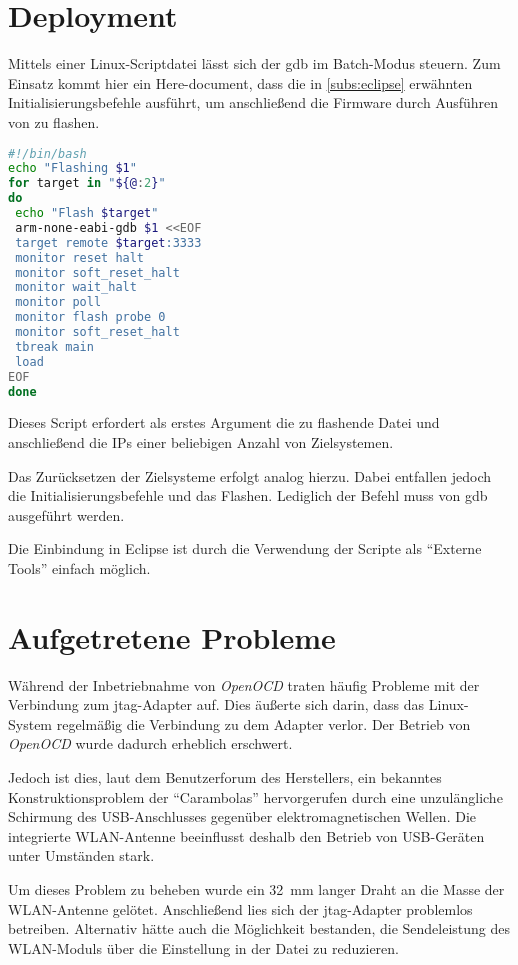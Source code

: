 \section{Deployment}\label{sect:deployment}
Mittels einer Linux-Scriptdatei lässt sich der \gls{gdb} im Batch-Modus steuern.
Zum Einsatz kommt hier ein Here-document, dass die in \autoref{subs:eclipse}
erwähnten Initialisierungsbefehle ausführt, um anschließend die Firmware durch
Ausführen von  zu flashen.
\begin{lstlisting}[language=sh]
#!/bin/bash
echo "Flashing $1"
for target in "${@:2}"
do
 echo "Flash $target"
 arm-none-eabi-gdb $1 <<EOF
 target remote $target:3333
 monitor reset halt
 monitor soft_reset_halt
 monitor wait_halt
 monitor poll
 monitor flash probe 0
 monitor soft_reset_halt
 tbreak main
 load
EOF
done
\end{lstlisting}
Dieses Script erfordert als erstes Argument die zu flashende Datei und
anschließend die IPs einer beliebigen Anzahl von Zielsystemen.

Das Zurücksetzen der Zielsysteme erfolgt analog hierzu. Dabei entfallen jedoch
die Initialisierungsbefehle und das Flashen. Lediglich der Befehl
 muss von gdb ausgeführt werden.

Die Einbindung in Eclipse ist durch die Verwendung der Scripte als "`Externe
Tools"' einfach möglich.
\section{Aufgetretene Probleme}
Während der Inbetriebnahme von \emph{OpenOCD} traten häufig Probleme mit der
Verbindung zum \gls{jtag}-Adapter auf. Dies äußerte sich darin, dass das
Linux-System regelmäßig die Verbindung zu dem Adapter verlor. Der Betrieb von
\emph{OpenOCD} wurde dadurch erheblich erschwert.

Jedoch ist dies, laut dem Benutzerforum des Herstellers, ein bekanntes
Konstruktionsproblem der "`Carambolas"' hervorgerufen durch eine unzulängliche
Schirmung des USB-Anschlusses gegenüber elektromagnetischen Wellen.
Die integrierte WLAN-Antenne beeinflusst deshalb den Betrieb von USB-Geräten
unter Umständen stark.

Um dieses Problem zu beheben wurde ein \SI{32}{\mm} langer Draht an die Masse
der WLAN-Antenne gelötet. Anschließend lies sich der \gls{jtag}-Adapter
problemlos betreiben. Alternativ hätte auch die Möglichkeit bestanden, die
Sendeleistung des WLAN-Moduls über die Einstellung 
in der Datei  zu reduzieren.

